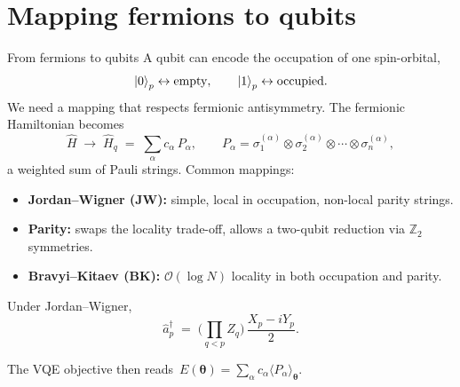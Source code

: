 \documentclass[10pt,aspectratio=169]{beamer}
\begin{document}
\section{Mapping fermions to qubits}

\begin{frame}{From fermions to qubits}
A qubit can encode the occupation of one spin-orbital,
\[
\ket{0}_p \leftrightarrow \text{empty},\qquad \ket{1}_p \leftrightarrow \text{occupied}.
\]
We need a mapping that respects fermionic antisymmetry. The fermionic Hamiltonian becomes
\[
\hat H \;\longrightarrow\; \hat H_q \;=\; \sum_\alpha c_\alpha\, P_\alpha,
\qquad
P_\alpha = \sigma_1^{(\alpha)}\otimes\sigma_2^{(\alpha)}\otimes\cdots\otimes\sigma_n^{(\alpha)},
\]
a weighted sum of Pauli strings. Common mappings:
\begin{itemize}
  \item \textbf{Jordan--Wigner (JW):} simple, local in occupation, non-local parity strings.
  \item \textbf{Parity:} swaps the locality trade-off, allows a two-qubit reduction via $\mathbb{Z}_2$ symmetries.
  \item \textbf{Bravyi--Kitaev (BK):} $\mathcal{O}(\log N)$ locality in both occupation and parity.
\end{itemize}

\smallskip
Under Jordan--Wigner,
\[
\hat a_p^\dagger \;=\; \Big(\prod_{q<p} Z_q\Big)\,\frac{X_p - i Y_p}{2}.
\]

\smallskip
The VQE objective then reads
\(\,E(\bm\theta) = \sum_\alpha c_\alpha \langle P_\alpha\rangle_{\bm\theta}.\)
\end{frame}
\end{document}
